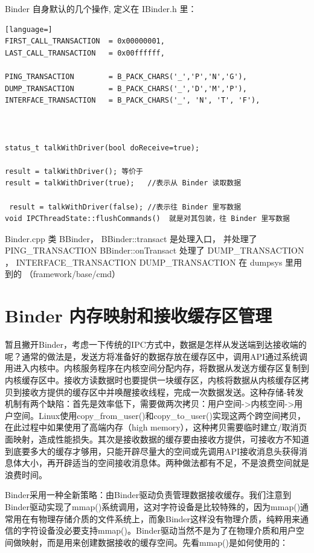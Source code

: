 \documentclass[a4paper,11pt]{article}
\begin{document}
Binder 自身默认的几个操作, 定义在 IBinder.h 里：
\begin{lstlisting}[language=]
FIRST_CALL_TRANSACTION  = 0x00000001,
LAST_CALL_TRANSACTION   = 0x00ffffff,

PING_TRANSACTION        = B_PACK_CHARS('_','P','N','G'),
DUMP_TRANSACTION        = B_PACK_CHARS('_','D','M','P'),
INTERFACE_TRANSACTION   = B_PACK_CHARS('_', 'N', 'T', 'F'),



status_t talkWithDriver(bool doReceive=true);

result = talkWithDriver(); 等价于
result = talkWithDriver(true);   //表示从 Binder 读取数据

 result = talkWithDriver(false); //表示往 Binder 里写数据
void IPCThreadState::flushCommands()  就是对其包装，往 Binder 里写数据
\end{lstlisting}

Binder.cpp  类 BBinder，
BBinder::transact 是处理入口， 并处理了  PING_TRANSACTION 
BBinder::onTransact 处理了 DUMP_TRANSACTION ， INTERFACE_TRANSACTION 
DUMP_TRANSACTION 在 dumpsys 里用到的 （framework/base/cmd）

\section{ Binder 内存映射和接收缓存区管理}
暂且撇开Binder，考虑一下传统的IPC方式中，数据是怎样从发送端到达接收端的呢？通常的做法是，发送方将准备好的数据存放在缓存区中，调用API通过系统调用进入内核中。内核服务程序在内核空间分配内存，将数据从发送方缓存区复制到内核缓存区中。接收方读数据时也要提供一块缓存区，内核将数据从内核缓存区拷贝到接收方提供的缓存区中并唤醒接收线程，完成一次数据发送。这种存储-转发机制有两个缺陷：首先是效率低下，需要做两次拷贝：用户空间->内核空间->用户空间。Linux使用copy_from_user()和copy_to_user()实现这两个跨空间拷贝，在此过程中如果使用了高端内存（high memory），这种拷贝需要临时建立/取消页面映射，造成性能损失。其次是接收数据的缓存要由接收方提供，可接收方不知道到底要多大的缓存才够用，只能开辟尽量大的空间或先调用API接收消息头获得消息体大小，再开辟适当的空间接收消息体。两种做法都有不足，不是浪费空间就是浪费时间。

Binder采用一种全新策略：由Binder驱动负责管理数据接收缓存。我们注意到Binder驱动实现了mmap()系统调用，这对字符设备是比较特殊的，因为mmap()通常用在有物理存储介质的文件系统上，而象Binder这样没有物理介质，纯粹用来通信的字符设备没必要支持mmap()。Binder驱动当然不是为了在物理介质和用户空间做映射，而是用来创建数据接收的缓存空间。先看mmap()是如何使用的：
\end{document}
